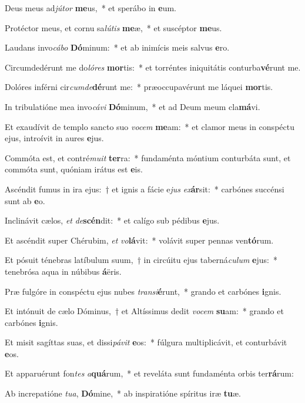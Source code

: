 \item Deus meus ad\textit{jú}\textit{tor} \textbf{me}us,~* et sperábo in \textbf{e}um.
\item Protéctor meus, et cornu sa\textit{lú}\textit{tis} \textbf{me}æ,~* et suscéptor \textbf{me}us.
\item Laudans invo\textit{cá}\textit{bo} \textbf{Dó}minum:~* et ab inimícis meis salvus \textbf{e}ro.
\item Circumdedérunt me do\textit{ló}\textit{res} \textbf{mor}tis:~* et torréntes iniquitátis conturba\textbf{vé}runt me.
\item Dolóres inférni cir\textit{cum}\textit{de}\textbf{dé}runt me:~* præoccupavérunt me láquei \textbf{mor}tis.
\item In tribulatióne mea invo\textit{cá}\textit{vi} \textbf{Dó}minum,~* et ad Deum meum cla\textbf{má}vi.
\item Et exaudívit de templo sancto suo \textit{vo}\textit{cem} \textbf{me}am:~* et clamor meus in conspéctu ejus, introívit in aures \textbf{e}jus.
\item Commóta est, et contré\textit{mu}\textit{it} \textbf{ter}ra:~* fundaménta móntium conturbáta sunt, et commóta sunt, quóniam irátus est \textbf{e}is.
\item Ascéndit fumus in ira ejus:~† et ignis a fácie e\textit{jus} \textit{ex}\textbf{ár}sit:~* carbónes succénsi sunt ab \textbf{e}o.
\item Inclinávit cælos, \textit{et} \textit{de}\textbf{scén}dit:~* et calígo sub pédibus \textbf{e}jus.
\item Et ascéndit super Chérubim, \textit{et} \textit{vo}\textbf{lá}vit:~* volávit super pennas ven\textbf{tó}rum.
\item Et pósuit ténebras latíbulum suum,~† in circúitu ejus taberná\textit{cu}\textit{lum} \textbf{e}jus:~* tenebrósa aqua in núbibus \textbf{á}ëris.
\item Præ fulgóre in conspéctu ejus nubes \textit{trans}\textit{i}\textbf{é}runt,~* grando et carbónes \textbf{i}gnis.
\item Et intónuit de cælo Dóminus,~† et Altíssimus dedit \textit{vo}\textit{cem} \textbf{su}am:~* grando et carbónes \textbf{i}gnis.
\item Et misit sagíttas suas, et dissi\textit{pá}\textit{vit} \textbf{e}os:~* fúlgura multiplicávit, et conturbávit \textbf{e}os.
\item Et apparuérunt fon\textit{tes} \textit{a}\textbf{quá}rum,~* et reveláta sunt fundaménta orbis ter\textbf{rá}rum:
\item Ab increpatióne \textit{tu}\textit{a}, \textbf{Dó}mine,~* ab inspiratióne spíritus iræ \textbf{tu}æ.
